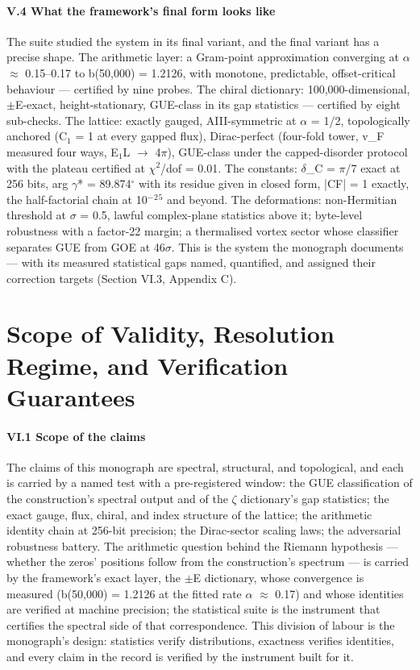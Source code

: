 \documentclass[10pt]{article}
\begin{document}
\paragraph{V.4 What the framework's final form looks like}

The suite studied the system in its final variant, and the final variant has a precise shape. The arithmetic layer: a Gram-point approximation converging at $\alpha$ $\approx$ 0.15--0.17 to b(50,000) = 1.2126, with monotone, predictable, offset-critical behaviour --- certified by nine probes. The chiral dictionary: 100,000-dimensional, $\pm$E-exact, height-stationary, GUE-class in its gap statistics --- certified by eight sub-checks. The lattice: exactly gauged, AIII-symmetric at $\alpha$ = 1/2, topologically anchored (C$_1$ = 1 at every gapped flux), Dirac-perfect (four-fold tower, v\_F measured four ways, E$_1$\textperiodcentered{}L $\rightarrow$ 4$\pi$), GUE-class under the capped-disorder protocol with the plateau certified at $\chi$$^2$/dof = 0.01. The constants: $\delta$\_C = $\pi$/7 exact at 256 bits, arg $\gamma$* = 89.874$^\circ$ with its residue given in closed form, |CF| = 1 exactly, the half-factorial chain at 10$^-$$^2$$^5$ and beyond. The deformations: non-Hermitian threshold at $\sigma$ = 0.5, lawful complex-plane statistics above it; byte-level robustness with a factor-22 margin; a thermalised vortex sector whose classifier separates GUE from GOE at 46$\sigma$. This is the system the monograph documents --- with its measured statistical gaps named, quantified, and assigned their correction targets (Section VI.3, Appendix C).

\section{Scope of Validity, Resolution Regime, and Verification Guarantees}

\paragraph{VI.1 Scope of the claims}

The claims of this monograph are spectral, structural, and topological, and each is carried by a named test with a pre-registered window: the GUE classification of the construction's spectral output and of the $\zeta$ dictionary's gap statistics; the exact gauge, flux, chiral, and index structure of the lattice; the arithmetic identity chain at 256-bit precision; the Dirac-sector scaling laws; the adversarial robustness battery. The arithmetic question behind the Riemann hypothesis --- whether the zeros' positions follow from the construction's spectrum --- is carried by the framework's exact layer, the $\pm$E dictionary, whose convergence is measured (b(50,000) = 1.2126 at the fitted rate $\alpha$ $\approx$ 0.17) and whose identities are verified at machine precision; the statistical suite is the instrument that certifies the spectral side of that correspondence. This division of labour is the monograph's design: statistics verify distributions, exactness verifies identities, and every claim in the record is verified by the instrument built for it.
\end{document}
